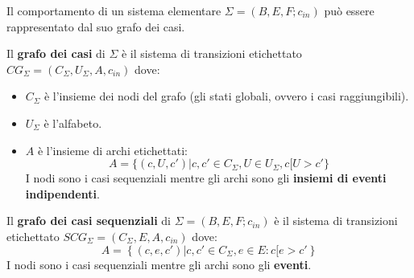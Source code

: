 Il comportamento di un sistema elementare $\Sigma = (B, E, F; c_{in})$ può essere
rappresentato dal suo grafo dei casi.
\begin{definizione}
    Il \textbf{grafo dei casi} di $\Sigma$ è il sistema di transizioni etichettato
    $CG_{\Sigma} = (C_{\Sigma},U_{\Sigma}, A, c_{in})$ dove:
    \begin{itemize}
        \item $C_{\Sigma}$ è l'insieme dei nodi del grafo (gli stati globali,
              ovvero i casi raggiungibili).
        \item $U_{\Sigma}$ è l'alfabeto.
        \item $A$ è l'insieme di archi etichettati:
              \begin{equation}
                  A = \{(c, U, c') | c, c' \in C_{\Sigma}, U \in U_{\Sigma}, c[U > c'\}
              \end{equation}
              I nodi sono i casi sequenziali mentre gli archi sono gli
              \textbf{insiemi di eventi indipendenti}.
    \end{itemize}
\end{definizione}
\begin{definizione}
    Il \textbf{grafo dei casi sequenziali} di $\Sigma=(B,E,F;c_{in})$ è
    il sistema di transizioni etichettato $SCG_\Sigma=(C_\Sigma, E, A,c_{in})$
    dove:
    \begin{equation}
        A=\left\{(c,e,c')|c,c'\in C_\Sigma, e\in E: c[e>c' \right\}
    \end{equation}
    I nodi sono i casi sequenziali mentre gli archi sono gli \textbf{eventi}.
\end{definizione}
